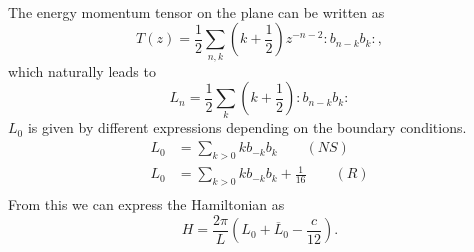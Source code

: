 \documentclass[submission, PhysLectNotes]{SciPost}
\begin{document}
 \\
The energy momentum tensor on the plane can be written as
\begin{equation}
  T(z) = \frac{1}{2}\sum_{n,k}(k+\frac{1}{2})z^{-n-2}:b_{n-k}b_k:,
\end{equation}
which naturally leads to
\begin{equation}
  L_n = \frac{1}{2}\sum_k(k+\frac{1}{2}):b_{n-k}b_{k}:
\end{equation}
$L_0$ is given by different expressions depending on the boundary conditions.
\begin{align}
  L_0 &= \sum_{k>0}kb_{-k}b_k \qquad (NS)\\
  L_0 &= \sum_{k>0}kb_{-k}b_k + \frac{1}{16} \qquad (R)\\
\end{align}
From this we can express the Hamiltonian as
\begin{equation}
  H = \frac{2\pi}{L}(L_0 + \overline{L}_0-\frac{c}{12}).
\end{equation}
\end{document}
